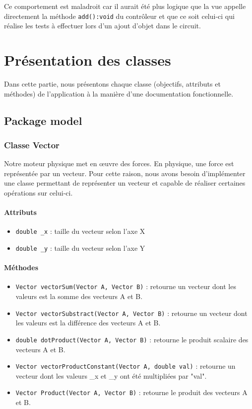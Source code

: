 \documentclass{report}
\begin{document}
Ce comportement est maladroit car il aurait été plus logique que la vue appelle directement la méthode \texttt{add():void} du contrôleur et que ce soit celui-ci qui réalise les tests à effectuer lors d'un ajout d'objet dans le circuit.

\section{Présentation des classes}

Dans cette partie, nous présentons chaque classe (objectifs, attributs et méthodes) de l'application à la manière d'une documentation fonctionnelle.

\subsection{Package model}

\subsubsection{Classe Vector}

Notre moteur physique met en œuvre des forces. En physique, une force est représentée par un vecteur. Pour cette raison, nous avons besoin d'implémenter une classe permettant de représenter un vecteur et capable de réaliser certaines opérations sur celui-ci.

\paragraph*{Attributs}
\begin{itemize}
\item \texttt{double \_x} : taille du vecteur selon l'axe X
\item \texttt{double \_y} : taille du vecteur selon l'axe Y
\end{itemize}

\paragraph*{Méthodes}
\begin{itemize}
\item \texttt{Vector vectorSum(Vector A, Vector B)} : retourne un vecteur dont les valeurs est la somme des vecteurs A et B.
\item \texttt{Vector vectorSubstract(Vector A, Vector B)} : retourne un vecteur dont les valeurs est la différence des vecteurs A et B.
\item \texttt{double dotProduct(Vector A, Vector B)} : retourne le produit scalaire des vecteurs A et B.
\item \texttt{Vector vectorProductConstant(Vector A, double val)} : retourne un vecteur dont les valeurs  \_x et \_y ont été multipliées par "val".
\item \texttt{Vector Product(Vector A, Vector B)} : retourne le produit des vecteurs A et B.
\end{itemize}
\end{document}
